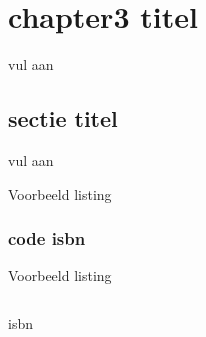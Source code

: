 \chapter{chapter3 titel}


vul aan

\section{sectie titel}
vul aan

Voorbeeld listing

\subsection{code isbn}
Voorbeeld listing
\begin{code}
\inputminted{python}{isbn.py}
\caption{isbn}
\end{code}